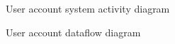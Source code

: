 \documentclass{article}
\begin{document}
\begin{figure}[H]
    \centering
    \begin{center}
    \end{center}
    \caption{User account system activity diagram}
    \label{fig:my_label}
\end{figure}

\begin{figure}[H]
    \centering
    \begin{center}
    \end{center}
    \caption{User account dataflow diagram}
    \label{fig:my_label}
\end{figure}
\end{document}
